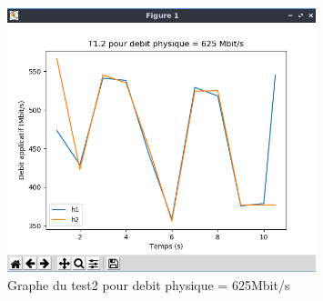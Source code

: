 \begin{figure}[H]
    \centering
    \includegraphics[width=0.8\textwidth]{./images/T1.2/courbe625test2.png}
    \caption{Graphe du test2 pour debit physique = 625Mbit/s}
    \label{fig:exemple}
\end{figure}

